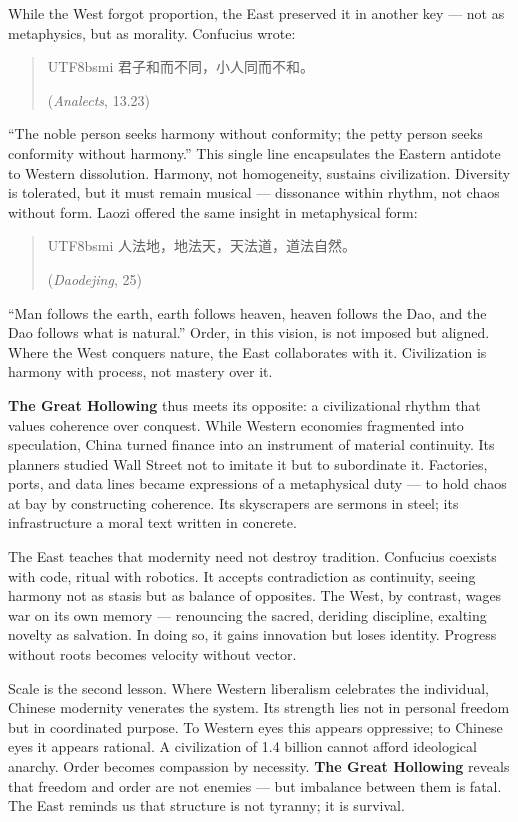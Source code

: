 \documentclass[11pt,twoside]{book}
\begin{document}
While the West forgot proportion, the East preserved it in another key — not as metaphysics, but as morality.  
Confucius wrote:  
\begin{quote}
\begin{CJK*}{UTF8}{bsmi}
君子和而不同，小人同而不和。
\end{CJK*}  
(\textit{Analects}, 13.23)
\end{quote}
“The noble person seeks harmony without conformity; the petty person seeks conformity without harmony.”  
This single line encapsulates the Eastern antidote to Western dissolution.  
Harmony, not homogeneity, sustains civilization.  
Diversity is tolerated, but it must remain musical — dissonance within rhythm, not chaos without form.
\clearpage
Laozi offered the same insight in metaphysical form:  
\begin{quote}
\begin{CJK*}{UTF8}{bsmi}
人法地，地法天，天法道，道法自然。
\end{CJK*}  
(\textit{Daodejing}, 25)
\end{quote}
“Man follows the earth, earth follows heaven, heaven follows the Dao, and the Dao follows what is natural.”  
Order, in this vision, is not imposed but aligned.  
Where the West conquers nature, the East collaborates with it.  
Civilization is harmony with process, not mastery over it.

\textbf{The Great Hollowing} thus meets its opposite: a civilizational rhythm that values coherence over conquest.  
While Western economies fragmented into speculation, China turned finance into an instrument of material continuity.  
Its planners studied Wall Street not to imitate it but to subordinate it.  
Factories, ports, and data lines became expressions of a metaphysical duty — to hold chaos at bay by constructing coherence.  
Its skyscrapers are sermons in steel; its infrastructure a moral text written in concrete.

The East teaches that modernity need not destroy tradition.  
Confucius coexists with code, ritual with robotics.  
It accepts contradiction as continuity, seeing harmony not as stasis but as balance of opposites.  
The West, by contrast, wages war on its own memory — renouncing the sacred, deriding discipline, exalting novelty as salvation.  
In doing so, it gains innovation but loses identity.  
Progress without roots becomes velocity without vector.

Scale is the second lesson.  
Where Western liberalism celebrates the individual, Chinese modernity venerates the system.  
Its strength lies not in personal freedom but in coordinated purpose.  
To Western eyes this appears oppressive; to Chinese eyes it appears rational.  
A civilization of 1.4 billion cannot afford ideological anarchy.  
Order becomes compassion by necessity.  
\textbf{The Great Hollowing} reveals that freedom and order are not enemies — but imbalance between them is fatal.  
The East reminds us that structure is not tyranny; it is survival.
\end{document}
